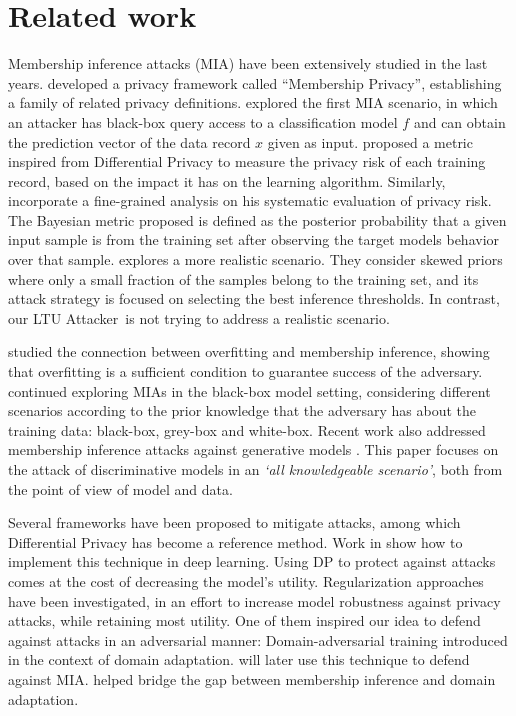 \documentclass[letterpaper]{article}
\newcommand{\oracle}{LTU Attacker~}
\begin{document}
\section{Related work}
Membership inference attacks (MIA) have been extensively studied in the last years. \cite{li2013membership} developed a privacy framework called ``Membership Privacy'', establishing a family of related privacy definitions. \cite{shokri2017membership} explored the first MIA scenario, in which an attacker has black-box query access to a classification model $f$ and can obtain the prediction vector of the data record $x$ given as input. \cite{long2017towards} proposed a metric inspired from Differential Privacy to measure the privacy risk of each training record, based on the impact it has on the learning algorithm.
Similarly, \cite{song2021systematic} incorporate a fine-grained analysis on his systematic evaluation of privacy risk. The Bayesian metric proposed is defined as the posterior probability that a given input sample is from the training set after observing the target models behavior over that sample. \cite{jayaraman2020revisiting} explores a more realistic scenario. They consider skewed priors where only a small fraction of the samples belong to the training set, and its attack strategy is focused on selecting the best inference thresholds. In contrast, our \oracle is not trying to address a realistic scenario.

\cite{yeom2018privacy} studied the connection between overfitting and membership inference, showing that overfitting is a sufficient condition to guarantee success of the adversary. \cite{truex2019demystifying} continued exploring MIAs in the black-box model setting, considering different scenarios according to the prior knowledge that the adversary has about the training data: black-box, grey-box and white-box. Recent work also addressed membership inference attacks against generative models \cite{hayes2018logan,hilprecht2019reconstruction,chen2020gan}.
This paper focuses on the attack of discriminative models in an {\em `all knowledgeable scenario'}, both from the point of view of model and data.

Several frameworks have been proposed to mitigate attacks, among which 
Differential Privacy \cite{dwork2006calibrating} has become a reference method. Work in \cite{abadi2016deep,xie2018differentially} show how to implement this technique in deep learning. Using DP to protect against attacks comes at the cost of decreasing the model's utility. 
Regularization approaches have been investigated, in an effort to increase model robustness against privacy attacks, while retaining most utility.
One of them inspired our idea to defend against attacks in an adversarial manner: Domain-adversarial training \cite{ganin2016domain} introduced in the context of domain adaptation. \cite{nasr2018machine} will later use this technique to defend against MIA. \cite{huang2021damia} helped bridge the gap between membership inference and domain adaptation.
\end{document}

